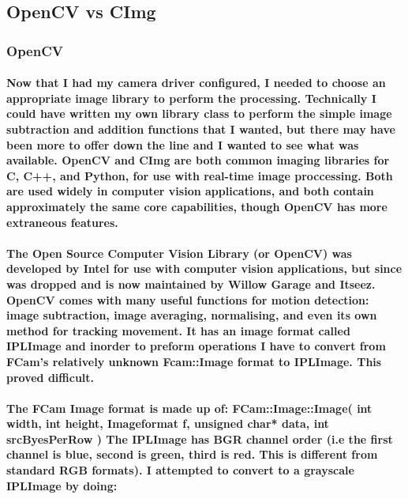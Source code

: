 \subsection{OpenCV vs CImg}
\subsubsection{OpenCV}
\paragraph{Now that I had my camera driver configured, I needed to choose an appropriate image library to perform the processing. Technically I could have written my own library class to perform the simple image subtraction and addition functions that I wanted, but there may have been more to offer down the line and I wanted to see what was available. OpenCV and CImg are both common imaging libraries for C, C++, and Python, for use with real-time image proccessing.  Both are used widely in computer vision applications, and both contain approximately the same core capabilities, though OpenCV has more extraneous features.}
\paragraph{The Open Source Computer Vision Library (or OpenCV) was developed by Intel for use with computer vision applications, but since was dropped and is now maintained by Willow Garage and Itseez.
\\OpenCV comes with many useful functions for motion detection: image subtraction, image averaging, normalising, and even its own method for tracking movement. It has an image format called IPLImage and inorder to preform operations I have to convert from FCam's relatively unknown Fcam::Image format to IPLImage. This proved difficult.
}
\paragraph{The FCam Image format is made up of:
FCam::Image::Image(
     int width,
     int height,
     Imageformat f,
     unsigned char* data,
     int srcByesPerRow
)
The IPLImage has BGR channel order (i.e the first channel is blue, second is green, third is red. This is different from standard RGB formats). I attempted to convert to a grayscale IPLImage by doing:}
\begin{frame}[fragile]

\end{frame}
